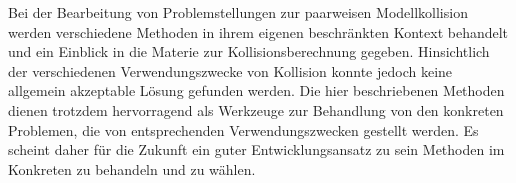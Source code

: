 
Bei der Bearbeitung von Problemstellungen zur paarweisen Modellkollision werden verschiedene Methoden in ihrem eigenen beschränkten Kontext behandelt und ein Einblick in die Materie zur Kollisionsberechnung gegeben. Hinsichtlich der verschiedenen Verwendungszwecke von Kollision konnte jedoch keine allgemein akzeptable Lösung gefunden werden. Die hier beschriebenen Methoden dienen trotzdem hervorragend als Werkzeuge zur Behandlung von den konkreten Problemen, die von entsprechenden Verwendungszwecken gestellt werden. Es scheint daher für die Zukunft ein guter Entwicklungsansatz zu sein Methoden im Konkreten zu behandeln und zu wählen.\\
